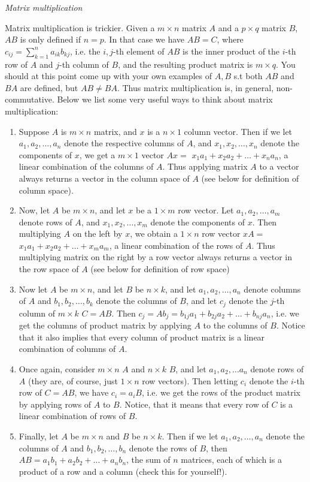 \documentclass[12pt,oneside]{article}
\begin{document}
\noindent \emph{Matrix multiplication}

Matrix multiplication is trickier. Given a $m \times n$ matrix $A$
and a $p \times q$ matrix $B$, $AB$ is only defined if $n = p$. In
that case we have $AB = C$, where $c_{ij} =
\displaystyle\sum_{k=1}^{n} {a_{ik} b_{kj}}$, i.e. the $i,j$-th
element of $AB$ is the inner product of the $i$-th row of $A$ and
$j$-th column of $B$, and the resulting product matrix is $m \times
q$. You should at this point come up with your own examples of $A, B$
s.t both $AB$ and $BA$ are defined, but $AB \neq BA$. Thus matrix
multiplication is, in general, non-commutative. Below we list some
very useful ways to think about matrix multiplication:
\begin{enumerate}
\item Suppose $A$ is $m \times n$ matrix, and $x$ is a $n \times 1$
  column vector. Then if we let $a_1, a_2, \ldots, a_n$ denote the respective
  columns of $A$, and $x_1, x_2, \ldots, x_n$ denote the components  of
  $x$,  we get a $m \times 1$ vector $Ax = $ $x_1 a_1 + x_2
  a_2 + \ldots + x_n a_n$, a linear combination of the columns of
  $A$. Thus applying matrix $A$ to a vector always returns a vector
  in the column space of $A$ (see below for definition of column
  space).
\item Now, let $A$ be $m \times n$, and let $x$ be a $1 \times m$ row
  vector. Let $a_1, a_2, \ldots, a_m$ denote rows of $A$, and $x_1,
  x_2, \ldots, x_m$ denote the components of $x$. Then multiplying $A$
  on the left by $x$, we obtain a $1 \times n$ row vector $x A =$ $x_1
  a_1 + x_2 a_2 + \ldots + x_m a_m$, a linear combination of the rows
  of $A$. Thus multiplying matrix on the right by a row vector always
  returns a vector in the row space of $A$ (see below for definition
  of row space)
\item Now let $A$ be $m \times n$, and let $B$ be $n \times k$, and
  let $a_1, a_2, \ldots, a_n$ denote columns of $A$ and  $b_1, b_2,
  \ldots, b_k$ denote the columns of $B$, and let $c_j$ denote the
  $j$-th column of $m \times k$ $C = AB$. Then $c_j = A b_j = b_{1j}
  a_1 + b_{2j} a_2 + \ldots +  b_{nj} a_n$, i.e. we get the columns of
  product matrix by applying $A$ to the columns of $B$. Notice that it
  also implies that every column of product matrix is a linear
  combination of columns of $A$.
\item Once again, consider $m \times n$ $A$ and $n \times k$ $B$, and
  let $a_1, a_2, \ldots a_n$ denote rows of $A$ (they are, of course,
  just $1 \times n$ row vectors). Then letting $c_i$ denote the $i$-th
  row of $C = AB$, we have $c_i = a_i B$, i.e. we get the rows of the
  product matrix by applying rows of $A$ to $B$. Notice, that it means
  that every row of $C$ is a linear combination of rows of $B$.
\item Finally, let $A$ be $m \times n$ and $B$ be $n \times k$. Then
  if we let $a_1, a_2, \ldots, a_n$ denote the columns of $A$ and
  $b_1, b_2, \ldots, b_n$ denote the rows of $B$, then $AB = a_1 b_1 +
  a_2 b_2 + \ldots + a_n b_n$, the sum of $n$ matrices, each of which
  is a product of a row and a column (check this for yourself!).
\end{enumerate}
\end{document}
